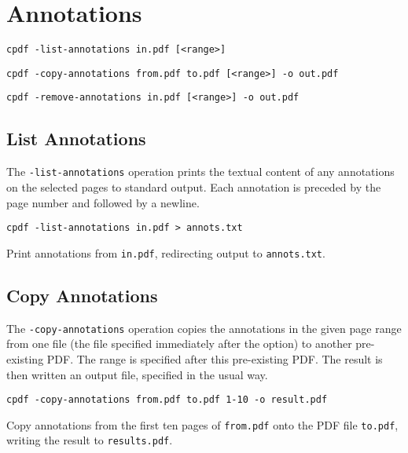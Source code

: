 \documentclass{book}
\begin{document}
\chapter{Annotations}
  \begin{framed}
  \small\noindent\verb!cpdf -list-annotations in.pdf [<range>]!

  \vspace{1.5mm}
  \small\noindent\verb!cpdf -copy-annotations from.pdf to.pdf [<range>] -o out.pdf!

  \vspace{1.5mm}
  \small\noindent\verb!cpdf -remove-annotations in.pdf [<range>] -o out.pdf!
  \end{framed}

  \section{List Annotations}
  The \texttt{-list-annotations} operation prints the textual content of any
annotations on the selected pages to standard output. Each annotation is preceded by the page number and followed by a newline.
  \begin{framed}
    \small\verb!cpdf -list-annotations in.pdf > annots.txt!
    
    \vspace{2.5mm}
    \noindent Print annotations from \texttt{in.pdf}, redirecting output to \texttt{annots.txt}.
  \end{framed}

  \section{Copy Annotations}
  The \texttt{-copy-annotations} operation copies the annotations in the given
page range from one file (the file specified immediately after the option) to
another pre-existing PDF. The range is specified after this pre-existing PDF.
The result is then written an output file, specified in the usual way.
  \begin{framed}
    \small\verb!cpdf -copy-annotations from.pdf to.pdf 1-10 -o result.pdf !
    
    \vspace{2.5mm}
    \noindent Copy annotations from the first ten pages of \texttt{from.pdf}
onto the PDF file \texttt{to.pdf}, writing the result to \texttt{results.pdf}.

  \end{framed}
\end{document}

